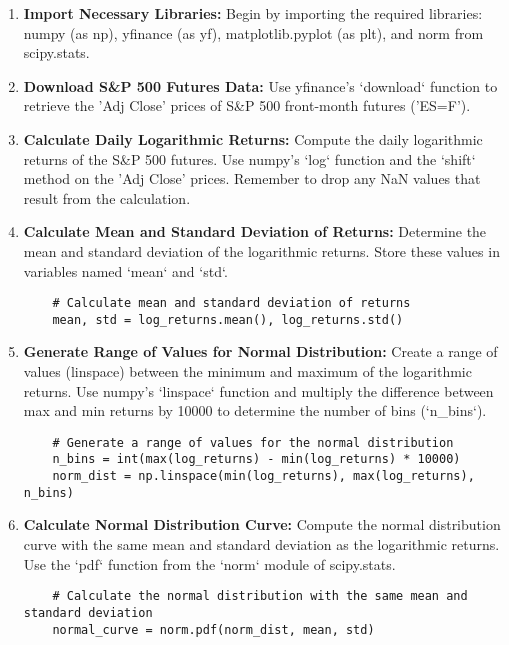 \documentclass{article}
\begin{document}
\begin{enumerate}
    \item \textbf{Import Necessary Libraries:} 
    Begin by importing the required libraries: numpy (as np), yfinance (as yf), matplotlib.pyplot (as plt), and norm from scipy.stats.

    \item \textbf{Download S\&P 500 Futures Data:}
    Use yfinance's `download` function to retrieve the 'Adj Close' prices of S\&P 500 front-month futures ('ES=F'). 

    \item \textbf{Calculate Daily Logarithmic Returns:}
    Compute the daily logarithmic returns of the S\&P 500 futures. Use numpy's `log` function and the `shift` method on the 'Adj Close' prices. Remember to drop any NaN values that result from the calculation.

    \item \textbf{Calculate Mean and Standard Deviation of Returns:}
    Determine the mean and standard deviation of the logarithmic returns. Store these values in variables named `mean` and `std`.
    \begin{verbatim}
    # Calculate mean and standard deviation of returns
    mean, std = log_returns.mean(), log_returns.std()
    \end{verbatim}

    \item \textbf{Generate Range of Values for Normal Distribution:}
    Create a range of values (linspace) between the minimum and maximum of the logarithmic returns. Use numpy's `linspace` function and multiply the difference between max and min returns by 10000 to determine the number of bins (`n\_bins`).
    \begin{verbatim}
    # Generate a range of values for the normal distribution
    n_bins = int(max(log_returns) - min(log_returns) * 10000)
    norm_dist = np.linspace(min(log_returns), max(log_returns), n_bins)
    \end{verbatim}

    \item \textbf{Calculate Normal Distribution Curve:}
    Compute the normal distribution curve with the same mean and standard deviation as the logarithmic returns. Use the `pdf` function from the `norm` module of scipy.stats.
    \begin{verbatim}
    # Calculate the normal distribution with the same mean and standard deviation
    normal_curve = norm.pdf(norm_dist, mean, std)
    \end{verbatim}


\end{enumerate}
\end{document}
